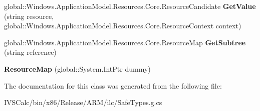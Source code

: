 \begin{DoxyCompactItemize}
\item 
\mbox{\label{class_windows_1_1_application_model_1_1_resources_1_1_core_1_1_resource_map_aef94042cd27f045f8035733034f6e2c4}} 
global\+::\+Windows.\+Application\+Model.\+Resources.\+Core.\+Resource\+Candidate {\bfseries Get\+Value} (string resource, global\+::\+Windows.\+Application\+Model.\+Resources.\+Core.\+Resource\+Context context)
\item 
\mbox{\label{class_windows_1_1_application_model_1_1_resources_1_1_core_1_1_resource_map_ac129a8e320a6dc314ec3767626950aa8}} 
global\+::\+Windows.\+Application\+Model.\+Resources.\+Core.\+Resource\+Map {\bfseries Get\+Subtree} (string reference)
\item 
\mbox{\label{class_windows_1_1_application_model_1_1_resources_1_1_core_1_1_resource_map_af0aec2b4469c89c900f7eed2f53504bf}} 
{\bfseries Resource\+Map} (global\+::\+System.\+Int\+Ptr dummy)
\end{DoxyCompactItemize}


The documentation for this class was generated from the following file\+:\begin{DoxyCompactItemize}
\item 
I\+V\+S\+Calc/bin/x86/\+Release/\+A\+R\+M/ilc/Safe\+Types.\+g.\+cs\end{DoxyCompactItemize}
